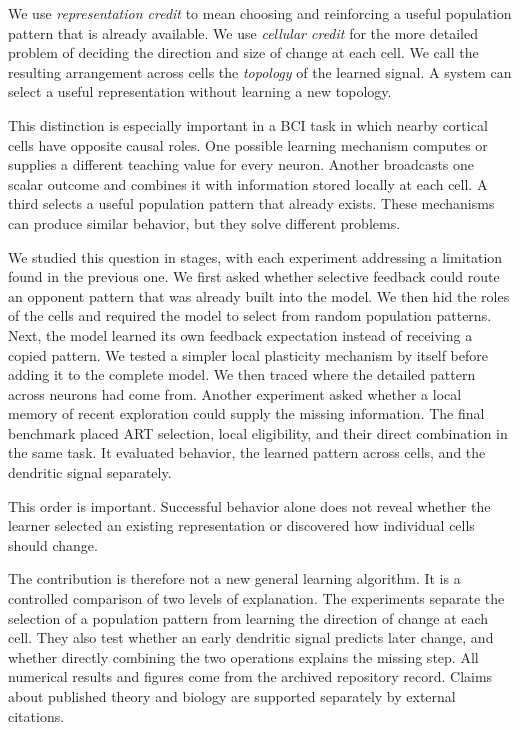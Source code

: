 \documentclass[11pt]{article}
\begin{document}
We use \emph{representation credit} to mean choosing and reinforcing a useful population pattern that is already available. We use \emph{cellular credit} for the more detailed problem of deciding the direction and size of change at each cell. We call the resulting arrangement across cells the \emph{topology} of the learned signal. A system can select a useful representation without learning a new topology.

This distinction is especially important in a BCI task in which nearby cortical cells have opposite causal roles. One possible learning mechanism computes or supplies a different teaching value for every neuron. Another broadcasts one scalar outcome and combines it with information stored locally at each cell. A third selects a useful population pattern that already exists. These mechanisms can produce similar behavior, but they solve different problems.

We studied this question in stages, with each experiment addressing a limitation found in the previous one. We first asked whether selective feedback could route an opponent pattern that was already built into the model. We then hid the roles of the cells and required the model to select from random population patterns. Next, the model learned its own feedback expectation instead of receiving a copied pattern. We tested a simpler local plasticity mechanism by itself before adding it to the complete model. We then traced where the detailed pattern across neurons had come from. Another experiment asked whether a local memory of recent exploration could supply the missing information. The final benchmark placed ART selection, local eligibility, and their direct combination in the same task. It evaluated behavior, the learned pattern across cells, and the dendritic signal separately.

This order is important. Successful behavior alone does not reveal whether the learner selected an existing representation or discovered how individual cells should change.

The contribution is therefore not a new general learning algorithm. It is a controlled comparison of two levels of explanation. The experiments separate the selection of a population pattern from learning the direction of change at each cell. They also test whether an early dendritic signal predicts later change, and whether directly combining the two operations explains the missing step. All numerical results and figures come from the archived repository record. Claims about published theory and biology are supported separately by external citations.
\end{document}
